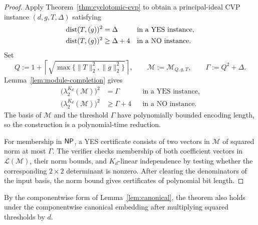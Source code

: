 \begin{proof}
Apply Theorem~\ref{thm:cyclotomic-cvp} to obtain a principal-ideal CVP
instance \((d,g,T,\Delta)\) satisfying
\[
\begin{aligned}
 \operatorname{dist}(T,(g))^2
   &=\Delta &&\text{in a YES instance},\\
 \operatorname{dist}(T,(g))^2
   &\geq\Delta+4 &&\text{in a NO instance}.
\end{aligned}
\]
Set
\[
 Q:=1+\left\lceil
 \sqrt{\max\{\|T\|_2^2,\|g\|_2^2\}}
 \right\rceil,
 \qquad
 \mathcal M:=\mathcal M_{Q,g,T},
 \qquad
 \Gamma:=Q^2+\Delta.
\]
Lemma~\ref{lem:module-completion} gives
\[
\begin{aligned}
 \bigl(\lambda_2^{K_d}(\mathcal M)\bigr)^2
   &=\Gamma &&\text{in a YES instance},\\
 \bigl(\lambda_2^{K_d}(\mathcal M)\bigr)^2
   &\geq\Gamma+4 &&\text{in a NO instance}.
\end{aligned}
\]
The basis of \(\mathcal M\) and the threshold \(\Gamma\) have
polynomially bounded encoding length, so the construction is a polynomial-time
reduction.

For membership in \(\mathsf{NP}\), a YES certificate consists of two vectors in
\(\mathcal M\) of squared norm at most \(\Gamma\).
The verifier checks membership of both coefficient vectors in
\(\mathcal L(\mathcal M)\), their norm bounds, and \(K_d\)-linear independence
by testing whether the corresponding \(2\times2\) determinant is nonzero.
After clearing the denominators of the
input basis, the norm bound gives certificates of polynomial bit length.
\end{proof}

\ifdefined\withModuleSIVP
{By the componentwise form of Lemma~\ref{lem:canonical}, the
theorem also holds under the componentwise canonical embedding after
multiplying squared thresholds by \(d\).}
\fi
